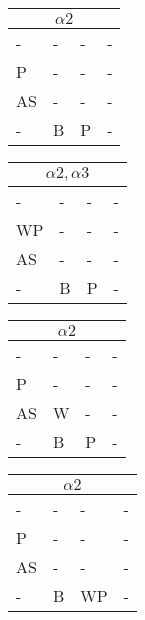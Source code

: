\documentclass{math}
\begin{document}
\begin{center}
  \begin{tabular}{|p{0.6cm}|p{0.6cm}|p{0.6cm}|p{0.6cm}|}
    \hline
    \multicolumn{4}{|c|}{\( \alpha2 \)} \\ \hline
    - & - & - & - \\ \hline
    P & - & - & - \\ \hline
    AS & - & - & - \\ \hline
    - & B & P & - \\ \hline
  \end{tabular}
  \begin{tabular}{|p{0.6cm}|p{0.6cm}|p{0.6cm}|p{0.6cm}|}
    \hline
    \multicolumn{4}{|c|}{\( \alpha2,\alpha3 \)} \\ \hline
    - & - & - & - \\ \hline
    WP & - & - & - \\ \hline
    AS & - & - & - \\ \hline
    - & B & P & - \\ \hline
  \end{tabular}
  \begin{tabular}{|p{0.6cm}|p{0.6cm}|p{0.6cm}|p{0.6cm}|}
    \hline
    \multicolumn{4}{|c|}{\( \alpha2 \)} \\ \hline
    - & - & - & - \\ \hline
    P & - & - & - \\ \hline
    AS & W & - & - \\ \hline
    - & B & P & - \\ \hline
  \end{tabular}
  \begin{tabular}{|p{0.6cm}|p{0.6cm}|p{0.6cm}|p{0.6cm}|}
    \hline
    \multicolumn{4}{|c|}{\( \alpha2 \)} \\ \hline
    - & - & - & - \\ \hline
    P & - & - & - \\ \hline
    AS & - & - & - \\ \hline
    - & B & WP & - \\ \hline
  \end{tabular} \\[0.5cm]


\end{center}
\end{document}
